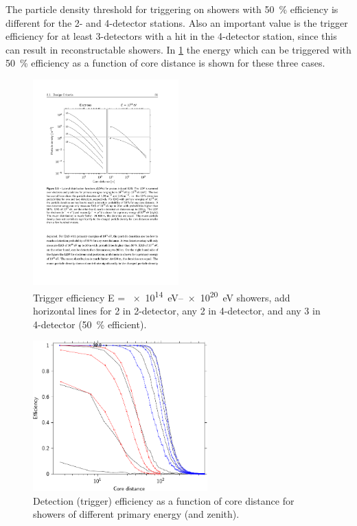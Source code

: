 The particle density threshold for triggering on showers with \SI{50}{\percent} efficiency is different for the 2- and 4-detector stations. Also an important value is the trigger efficiency for at least 3-detectors with a hit in the 4-detector station, since this can result in reconstructable showers. In \cref{fig:ldf_energies2} the energy which can be triggered with \SI{50}{\percent} efficiency as a function of core distance is shown for these three cases.

\begin{figure}
    \centering
    \includegraphics[width=0.5\textwidth]
                    {plots/station/ldf_energies}
    \caption{Trigger efficiency E = \SIrange{e14}{e20}{\eV} showers, add horizontal lines for 2 in 2-detector, any 2 in 4-detector, and any 3 in 4-detector (\SI{50}{\percent} efficient).}
    \label{fig:ldf_energies2}
\end{figure}

\begin{figure}
    \centering
    \includegraphics[width=0.6\textwidth]
                    {plots/station/efficiency_two_16}
    \caption{Detection (trigger) efficiency as a function of core distance for showers of different primary energy (and zenith).}
    \label{fig:efficiency_two_16}
\end{figure}


